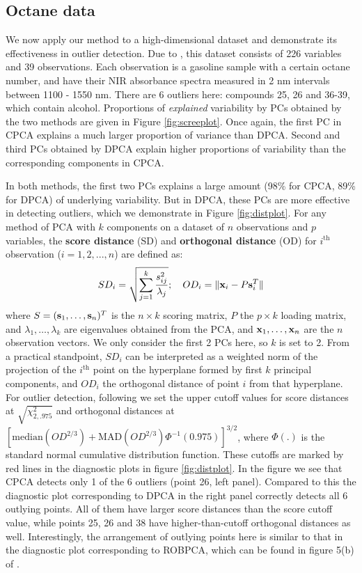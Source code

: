 \documentclass[fleqn,11pt]{article}
\begin{document}
\subsection{Octane data}
We now apply our method to a high-dimensional dataset and demonstrate its effectiveness in outlier detection. Due to \cite{esbensen94}, this dataset consists of 226 variables and 39 observations. Each observation is a gasoline sample with a certain octane number, and have their NIR absorbance spectra measured in 2 nm intervals between 1100 - 1550 nm. There are 6 outliers here: compounds 25, 26 and 36-39, which contain alcohol. Proportions of \textit{explained} variability by PCs obtained by the two methods are given in Figure \ref{fig:screeplot}. Once again, the first PC in CPCA explains a much larger proportion of variance than DPCA. Second and third PCs obtained by DPCA explain higher proportions of variability than the corresponding components in CPCA.

In both methods, the first two PCs explains a large amount (98\% for CPCA, 89\% for DPCA) of underlying variability. But in DPCA, these PCs are more effective in detecting outliers, which we demonstrate in Figure \ref{fig:distplot}. For any method of PCA with $k$ components on a dataset of $n$ observations and $p$ variables, the \textbf{score distance} (SD) and \textbf{orthogonal distance} (OD) for $i^\text{th}$ observation ($i=1,2,...,n$) are defined as:
$$ SD_i = \sqrt{ \sum_{j=1}^k \frac{s^2_{ij}}{\lambda_j}}; \quad OD_i = \| {\bf{x}}_i - P{\bf{s}}_i^T \| $$
where $S = ({\bf{s}}_1, \ldots ,{\bf{s}}_n)^T$ is the $n\times k$ scoring matrix, $P$ the $p\times k$ loading matrix, and $\lambda_1,\ldots ,\lambda_k$ are eigenvalues obtained from the PCA, and ${\bf{x}}_1,\ldots,{\bf{x}}_n$ are the $n$ observation vectors. We only consider the first 2 PCs here, so $k$ is set to 2. From a practical standpoint, $SD_i$ can be interpreted as a weighted norm of the projection of the $i^\text{th}$ point on the hyperplane formed by first $k$ principal components, and $OD_i$ the orthogonal distance of point $i$ from that hyperplane. For outlier detection, following \cite{hubert05} we set the upper cutoff values for score distances at $\sqrt{\chi^2_{2,.975}}$ and orthogonal distances at $[\text{median}(OD^{2/3}) + \text{MAD}(OD^{2/3})\Phi^{-1}(0.975)]^{3/2}$, where $\Phi(.)$ is the standard normal cumulative distribution function. These cutoffs are marked by red lines in the diagnostic plots in figure \ref{fig:distplot}. In the figure we see that CPCA detects only 1 of the 6 outliers (point 26, left panel). Compared to this the diagnostic plot corresponding to DPCA in the right panel correctly detects all 6 outlying points. All of them have larger score distances than the score cutoff value, while points 25, 26 and 38 have higher-than-cutoff orthogonal distances as well. Interestingly, the arrangement of outlying points here is similar to that in the diagnostic plot corresponding to ROBPCA, which can be found in figure 5(b) of \cite{hubert05}.
\end{document}
